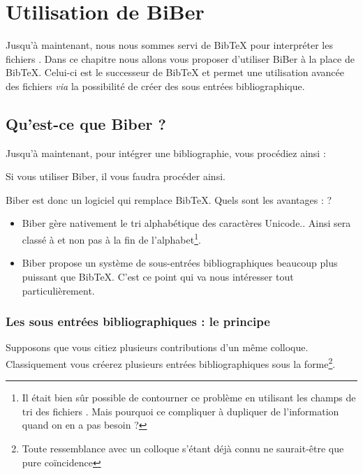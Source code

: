 \chapter{Utilisation de BiBer}

\begin{prealable}
Jusqu'à maintenant, nous nous sommes servi de BibTeX pour interpréter les fichiers . Dans ce chapitre nous allons vous proposer d'utiliser BiBer à la place de BibTeX. Celui-ci est le successeur de BibTeX et permet une utilisation avancée des fichiers  \emph{via} la possibilité de créer des sous entrées bibliographique.
\end{prealable}

\section{Qu'est-ce que Biber ?}

Jusqu'à maintenant, pour intégrer une bibliographie, vous procédiez ainsi :

Si vous utiliser Biber, il vous faudra procéder ainsi.

Biber est donc un logiciel qui remplace BibTeX. Quels sont les avantages : ?

\begin{itemize}
\item Biber gère nativement le tri alphabétique des caractères Unicode.. Ainsi  sera classé à  et non pas à la fin de l'alphabet\footnote{Il était bien sûr possible de contourner ce problème en utilisant les champs de tri des fichiers . Mais pourquoi ce compliquer à dupliquer de l'information quand on en a  pas besoin ?}.
\item Biber propose un système de sous-entrées bibliographiques beaucoup plus puissant que BibTeX. C'est ce point qui va nous intéresser tout particulièrement.
\end{itemize}

\subsection[Principe des sous-entrées]{Les sous entrées bibliographiques : le principe}

Supposons que vous citiez plusieurs contributions d'un même colloque. Classiquement vous créerez plusieurs entrées bibliographiques sous la forme\footnote{Toute ressemblance avec un colloque s'étant déjà connu ne saurait-être que pure coïncidence}.

